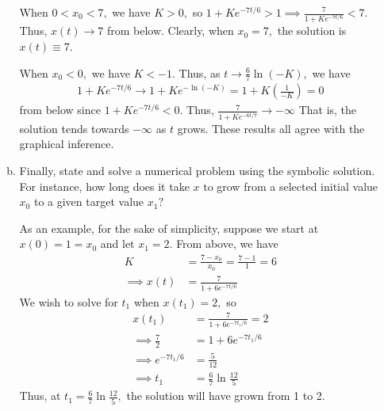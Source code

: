 \documentclass{article}
\begin{document}
\begin{enumerate}
\begin{enumerate}[(a)]
\begin{soln}
					When $0<x_0<7,$ we have $K>0,$ so $1+Ke^{-7t/6}>1\implies \frac{7}{1+Ke^{-7t/6}}<7.$ Thus, $x(t)\to 7$ from below. Clearly, when $x_0=7,$ the solution is $x(t)\equiv 7.$

					When $x_0<0,$ we have $K<-1.$ Thus, as $t\to \frac{6}{7}\ln(-K),$ we have
					\begin{align*}
						1+Ke^{-7t/6}\to 1+Ke^{-\ln(-K)} = 1 + K\left( \frac{1}{-K} \right) = 0
					\end{align*}
					from below since $1+Ke^{-7t/6}<0.$ Thus, $\frac{7}{1+Ke^{-6t/7}}\to-\infty$ That is, the solution tends towards $-\infty$ as $t$ grows. These results all agree with the graphical inference.
				\end{soln}
				\newpage

			\item Finally, state and solve a numerical problem using the symbolic solution. For instance, how long does it take $x$ to grow from a selected initial value $x_0$ to a given target value $x_1?$
				\begin{soln}
					As an example, for the sake of simplicity, suppose we start at $x(0)=1=x_0$ and let $x_1=2.$ From above, we have
					\begin{align*}
						K &= \frac{7-x_0}{x_0} = \frac{7-1}{1} = 6 \\
						\implies x(t) &= \frac{7}{1+6e^{-7t/6}}
					\end{align*}
					We wish to solve for $t_1$ when $x(t_1)=2,$ so
					\begin{align*}
						x(t_1) &= \frac{7}{1+6e^{-7t_1/6}} = 2 \\
						\implies \frac{7}{2} &= 1+6e^{-7t_1/6} \\
						\implies e^{-7t_1/6} &= \frac{5}{12} \\
						\implies t_1 &= \frac{6}{7}\ln\frac{12}{5}
					\end{align*}
					Thus, at $t_1=\frac{6}{7}\ln\frac{12}{5},$ the solution will have grown from 1 to 2.
				\end{soln}

		\end{enumerate}


\end{enumerate}
\end{document}
